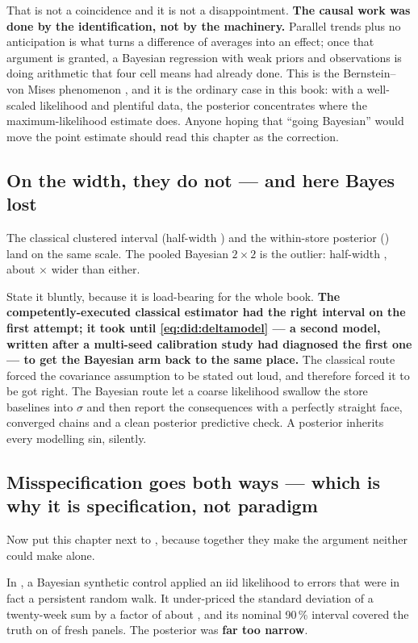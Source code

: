 That is not a coincidence and it is not a disappointment. \textbf{The causal work was done by the
identification, not by the machinery.} Parallel trends plus no anticipation is what turns a
difference of averages into an effect; once that argument is granted, a Bayesian regression with
weak priors and \nbEightNObs{} observations is doing arithmetic that four cell means had already
done. This is the Bernstein--von Mises phenomenon \citep{gelman2013}, and it is the ordinary case in
this book: with a well-scaled likelihood and plentiful data, the posterior concentrates where the
maximum-likelihood estimate does. Anyone hoping that ``going Bayesian'' would move the point
estimate should read this chapter as the correction.

\subsection*{On the width, they do not --- and here Bayes lost}

The classical clustered interval (half-width \eur{\nbEightAttClHalf}) and the within-store posterior
(\eur{\nbEightFeHalf}) land on the same scale. The pooled Bayesian $2 \times 2$ is the outlier:
half-width \eur{\nbEightBayesHalf}, about \nbEightBayesOverCluster$\times$ wider than either.

State it bluntly, because it is load-bearing for the whole book. \textbf{The
competently-executed classical estimator had the right interval on the first attempt; it took until
\cref{eq:did:deltamodel} --- a second model, written after a multi-seed calibration study had
diagnosed the first one --- to get the Bayesian arm back to the same place.} The classical route
forced the covariance assumption to be stated out loud, and therefore forced it to be got right. The
Bayesian route let a coarse likelihood swallow the store baselines into $\sigma$ and then report the
consequences with a perfectly straight face, converged chains and a clean posterior predictive check.
A posterior inherits every modelling sin, silently.

\subsection*{Misspecification goes both ways --- which is why it is specification, not paradigm}

Now put this chapter next to , because together they make the argument neither could
make alone.

In , a Bayesian synthetic control applied an iid likelihood to errors that were in fact
a persistent random walk. It under-priced the standard deviation of a twenty-week sum by a factor of
about \nbSevenUnderprice, and its nominal 90\,\% interval covered the truth on
\pc{\nbSevenTotalCov} of fresh panels. The posterior was \textbf{far too narrow}.

